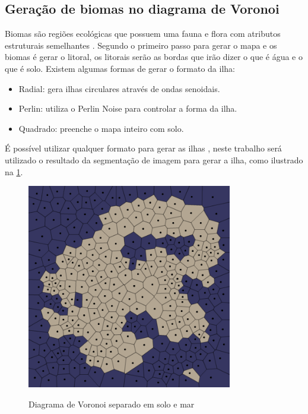 \subsection{Geração de biomas no diagrama de Voronoi}

Biomas são regiões ecológicas que possuem uma fauna e flora com atributos estruturais semelhantes \cite{maestrovirtuale}. Segundo  o primeiro passo para gerar o mapa e os biomas é gerar o litoral, os litorais serão as bordas que irão dizer o que é água e o que é solo. Existem algumas formas de gerar o formato da ilha:

\begin{itemize}
    \item Radial: gera ilhas circulares através de ondas senoidais.
    \item Perlin: utiliza o Perlin Noise para controlar a forma da ilha.
    \item Quadrado: preenche o mapa inteiro com solo.
\end{itemize}

É possível utilizar qualquer formato para gerar as ilhas \cite{amitp2010}, neste trabalho será utilizado o resultado da segmentação de imagem para gerar a ilha, como ilustrado na \cref{fig:voronoi-land-water}.

\begin{figure}[H]
	\caption{Diagrama de Voronoi separado em solo e mar}
	\centering %
	\includegraphics[width=0.8\textwidth]{figures/voronoi-land-water.png} %
	\label{fig:voronoi-land-water}
\end{figure}

